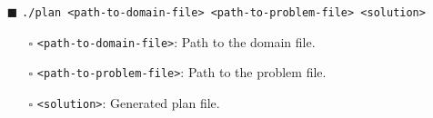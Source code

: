\begin{itemize}
  \item[\textcolor{BrickRed}{$\blacksquare$}] \texttt{./plan <path-to-domain-file> <path-to-problem-file> <solution>}
    \begin{itemize}
      \item[\textcolor{BrickRed}{$\square$}] \texttt{<path-to-domain-file>}: Path to the domain file.
      \item[\textcolor{BrickRed}{$\square$}] \texttt{<path-to-problem-file>}: Path to the problem file.
      \item[\textcolor{BrickRed}{$\square$}] \texttt{<solution>}: Generated plan file.
    \end{itemize}
\end{itemize}



